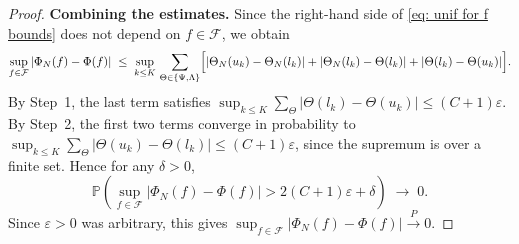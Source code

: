 \documentclass{amsart}
\newtheorem{lemma}[theorem]{Lemma}
\theoremstyle{definition}
\newcommand{\E}{{\mathbb E}}
\newcommand{\R}{{\mathbb R}}
\newcommand{\F}{\mathcal{F}}
\begin{document}
\begin{proof}
\noindent\textbf{Combining the estimates.}
Since the right-hand side of \eqref{eq: unif for f bounds} does not depend on $f\in\F$, we obtain
\begin{equation*}
    \sup_{f\in\F}|\Phi_N(f)-\Phi(f)|
    \;\le\;
    \sup_{k\le K}\,\sum_{\Theta\in\{\Psi,\Lambda\}}
    \Bigl[
        |\Theta_N(u_k)-\Theta_N(l_k)|
        + |\Theta_N(l_k)-\Theta(l_k)|
        + |\Theta(l_k)-\Theta(u_k)|
    \Bigr].
\end{equation*}
By Step~1, the last term satisfies $\sup_{k\le K}\sum_\Theta|\Theta(l_k)-\Theta(u_k)|\le (C+1)\varepsilon$.
By Step~2, the first two terms converge in probability to $\sup_{k\le K}\sum_\Theta|\Theta(u_k)-\Theta(l_k)|\le (C+1)\varepsilon$,
since the supremum is over a finite set.
Hence for any $\delta>0$,
\begin{equation*}
   \mathbb{P}\!\left(\sup_{f\in\F}|\Phi_N(f)-\Phi(f)|>2(C+1)\varepsilon+\delta\right)\;\longrightarrow\;0.
\end{equation*}
Since $\varepsilon>0$ was arbitrary, this gives $\sup_{f\in\F}|\Phi_N(f)-\Phi(f)|\xrightarrow{P}0$.    
\end{proof}



\end{document}
